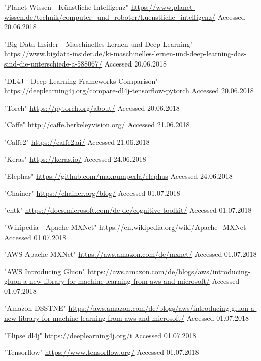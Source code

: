 \documentclass[journal]{IEEEtran}
\begin{document}
\begin{thebibliography}{1}
"Planet Wissen - Künstliche Intelligenz"
\url{https://www.planet-wissen.de/technik/computer_und_roboter/kuenstliche_intelligenz/} 
Accessed 20.06.2018

"Big Data Insider - Maschinelles Lernen und Deep Learning"
\url{https://www.bigdata-insider.de/ki-maschinelles-lernen-und-deep-learning-das-sind-die-unterschiede-a-588067/} 
Accessed 20.06.2018

"DL4J - Deep Learning Frameworks Comparison"
\url{https://deeplearning4j.org/compare-dl4j-tensorflow-pytorch}
Accessed 20.06.2018

"Torch"
\url{https://pytorch.org/about/}
Accessed 20.06.2018

"Caffe"
\url{http://caffe.berkeleyvision.org/}
Accessed 21.06.2018

"Caffe2"
\url{https://caffe2.ai/}
Accessed 21.06.2018

"Keras"
\url{https://keras.io/}
Accessed 24.06.2018

"Elephas"
\url{https://github.com/maxpumperla/elephas}
Accessed 24.06.2018

"Chainer"
\url{https://chainer.org/blog/}
Accessed 01.07.2018

"\acf{cntk}"
\url{https://docs.microsoft.com/de-de/cognitive-toolkit/}
Accessed 01.07.2018

"Wikipedia - Apache MXNet"
\url{https://en.wikipedia.org/wiki/Apache_MXNet}
Accessed 01.07.2018

"AWS Apache MXNet"
\url{https://aws.amazon.com/de/mxnet/}
Accessed 01.07.2018

"AWS Introducing Gluon"
\url{https://aws.amazon.com/de/blogs/aws/introducing-gluon-a-new-library-for-machine-learning-from-aws-and-microsoft/}
Accessed 01.07.2018

"Amazon DSSTNE"
\url{https://aws.amazon.com/de/blogs/aws/introducing-gluon-a-new-library-for-machine-learning-from-aws-and-microsoft/}
Accessed 01.07.2018

"Elipse \acf{dl4j}"
\url{https://deeplearning4j.org/i}
Accessed 01.07.2018

"Tensorflow"
\url{https://www.tensorflow.org/}
Accessed 01.07.2018


\end{thebibliography}
\end{document}
